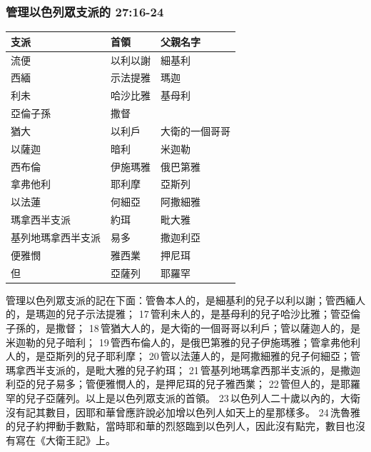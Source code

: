 \subsubsection{管理以色列眾支派的 27:16-24} 
\begin{table}
\centering
\begin{tabular}{p{3.5cm}|p{}|p{2.6cm}}\hline\hline
支派        &首領          & 父親名字        \\\hline
流便  &以利以謝               &細基利\\\hline
西緬  &示法提雅 &瑪迦 \\\hline
利未  &哈沙比雅 &基母利 \\\hline
亞倫子孫  &撒督& \\\hline
猶大 &  以利戶 &大衛的一個哥哥\\\hline
以薩迦  &暗利  &米迦勒  \\\hline
 西布倫  &伊施瑪雅 &俄巴第雅\\\hline
 拿弗他利 & 耶利摩 &亞斯列\\\hline
 以法蓮&何細亞 &阿撒細雅\\\hline
 瑪拿西半支派&約珥  &毗大雅\\\hline
 基列地瑪拿西半支派&易多 &  撒迦利亞\\\hline
 便雅憫 &雅西業& 押尼珥 \\\hline
 但 &亞薩列& 耶羅罕\\\hline
\end{tabular}
\end{table}
管理以色列眾支派的記在下面：管魯本人的，是細基利的兒子以利以謝；管西緬人的，是瑪迦的兒子示法提雅； 17 管利未人的，是基母利的兒子哈沙比雅；管亞倫子孫的，是撒督； 18 管猶大人的，是大衛的一個哥哥以利戶；管以薩迦人的，是米迦勒的兒子暗利； 19 管西布倫人的，是俄巴第雅的兒子伊施瑪雅；管拿弗他利人的，是亞斯列的兒子耶利摩； 20 管以法蓮人的，是阿撒細雅的兒子何細亞；管瑪拿西半支派的，是毗大雅的兒子約珥； 21 管基列地瑪拿西那半支派的，是撒迦利亞的兒子易多；管便雅憫人的，是押尼珥的兒子雅西業； 22 管但人的，是耶羅罕的兒子亞薩列。以上是以色列眾支派的首領。 23 以色列人二十歲以內的，大衛沒有記其數目，因耶和華曾應許說必加增以色列人如天上的星那樣多。 24 洗魯雅的兒子約押動手數點，當時耶和華的烈怒臨到以色列人，因此沒有點完，數目也沒有寫在《大衛王記》上。

